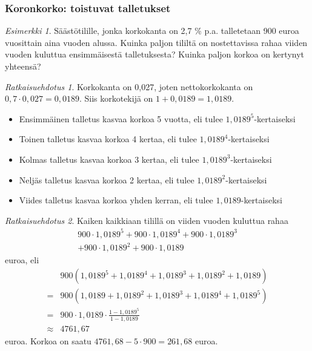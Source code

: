 \documentclass[]{beamer}\usepackage[]{graphicx}\usepackage[]{color}
\theoremstyle{remark}
\newtheorem{esim}{Esimerkki}
\newtheorem{ratkaisu}{Ratkaisuehdotus}
\begin{document}
\begin{frame}
\frametitle{Koronkorko: toistuvat talletukset}
	\begin{esim}
		Säästötilille, jonka korkokanta on 2,7 \% p.a. talletetaan 900 euroa vuosittain aina vuoden alussa.
		Kuinka paljon tililtä on nostettavissa rahaa viiden vuoden kuluttua ensimmäisestä talletuksesta?
		Kuinka paljon korkoa on kertynyt yhteensä?
	\end{esim}
\end{frame}

\begin{frame}
	\begin{ratkaisu}
		\pause 
    Korkokanta on 0,027, joten nettokorkokanta on \(0,7\cdot0,027 = 0,0189\). \pause
		Siis korkotekijä on \(1+0,0189 =	1,0189\). \pause
		\begin{itemize}
		    \item Ensimmäinen talletus kasvaa korkoa 5 vuotta, eli tulee \(1,0189^5\)-kertaiseksi\pause
		    \item Toinen talletus kasvaa korkoa 4 kertaa, eli tulee \(1,0189^4\)-kertaiseksi\pause
		    \item Kolmas talletus kasvaa korkoa 3 kertaa, eli tulee \(1,0189^3\)-kertaiseksi\pause
		    \item Neljäs talletus kasvaa korkoa 2 kertaa, eli tulee \(1,0189^2\)-kertaiseksi\pause
		    \item Viides talletus kasvaa korkoa yhden kerran, eli tulee \(1,0189\)-kertaiseksi
		\end{itemize}
	\end{ratkaisu}
\end{frame}


\begin{frame}
    \begin{ratkaisu}
        Kaiken kaikkiaan tilillä on viiden vuoden kuluttua rahaa
        \begin{multline*}
            900\cdot1,0189^5 + 900\cdot1,0189^4 + 900\cdot1,0189^3\\
             +900\cdot1,0189^2 + 900\cdot1,0189
        \end{multline*}
        euroa, eli\pause
        \begin{align*}
            &900(1,0189^5 + 1,0189^4 + 1,0189^3 + 1,0189^2 + 1,0189)\\
            =&900(1,0189 + 1,0189^2 + 1,0189^3 + 1,0189^4 + 1,0189^5)\\
            =&900\cdot1,0189\cdot\frac{1-1,0189^5}{1-1,0189}\\
            \approx & 4761,67
        \end{align*}
        euroa. \pause Korkoa on saatu \(4761,68-5\cdot900 = 261,68\) euroa.
    \end{ratkaisu}
\end{frame}
\end{document}

